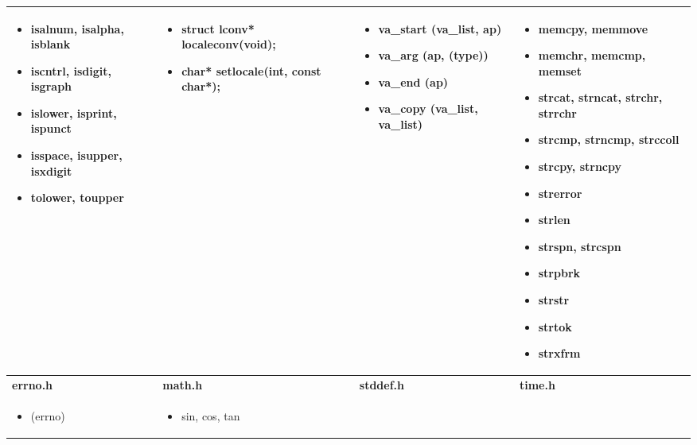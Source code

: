 \begin{table*}[h]
\begin{tabular}{|p{3cm}|p{3cm}|p{3cm}|p{6.5cm}|}
\begin{itemize}
\setlength{\itemsep}{0cm}
\setlength{\parskip}{0cm}
	\item isalnum, isalpha, isblank
	\item iscntrl, isdigit, isgraph
	\item islower, isprint, ispunct
	\item isspace, isupper, isxdigit
	\item tolower, toupper
\end{itemize}
 &  \begin{itemize}
\setlength{\itemsep}{0cm}
\setlength{\parskip}{0cm}
	\item struct lconv* localeconv(void);
	\item char* setlocale(int, const char*);
\end{itemize}
 &  \begin{itemize}
\setlength{\itemsep}{0cm}
\setlength{\parskip}{0cm}
	\item va\_start (va\_list, ap)
	\item va\_arg (ap, (type))
	\item va\_end (ap)
	\item va\_copy (va\_list, va\_list)
\end{itemize}
 &  \begin{itemize}
\setlength{\itemsep}{0cm}
\setlength{\parskip}{0cm}
	\item memcpy, memmove
	\item memchr, memcmp, memset
	\item strcat, strncat, strchr, strrchr
	\item strcmp, strncmp, strccoll
	\item strcpy, strncpy
	\item strerror
	\item strlen
	\item strspn, strcspn
	\item strpbrk
	\item strstr
	\item strtok
	\item strxfrm
\end{itemize}
 \\ \hline
		\textbf{ errno.h} & \textbf{ math.h} & \textbf{ stddef.h} & \textbf{ time.h} \\ \hline
		 \begin{itemize}
	\item (errno)
\end{itemize}
 &  \begin{itemize}
\setlength{\itemsep}{0cm}
\setlength{\parskip}{0cm}
	\item sin, cos, tan

\end{itemize}
\end{tabular}
\end{table*}
